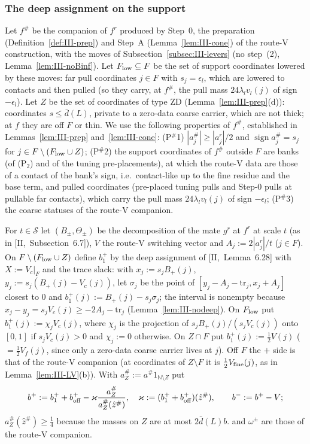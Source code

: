 \documentclass[10pt]{amsart}
\theoremstyle{definition}
\theoremstyle{remark}
\newcommand{\sgn}{\operatorname{sign}}
\newcommand{\N}{\mathbb N}
\newcommand{\zh}{\hat z}
\begin{document}
\subsubsection*{The deep assignment on the support}
Let $f^\#$ be the companion of $f^r$ produced by Step~0, the preparation
(Definition~\ref{def:III-prep}) and Step~A (Lemma~\ref{lem:III-cone}) of the
route-V construction, with the moves of Subsection~\ref{subsec:III-levers}
(no step~(2), Lemma~\ref{lem:III-noBinf}).  Let $F_{\rm low}\subseteq F$ be the
set of support coordinates lowered by these moves: far pull coordinates
$j\in F$ with $s_j=\epsilon_l$, which are lowered to contacts and then pulled
(so they carry, at $f^\#$, the pull mass $24\lambda_lv_l(j)$ of sign
$-\epsilon_l$).  Let $Z$ be the set of coordinates of type ZD
(Lemma~\ref{lem:III-prep}(d)): coordinates $s\le\bar d(L)$, private to a
zero-data coarse carrier, which are not thick; at $f$ they are off $F$ or thin.
We use the following properties of $f^\#$, established in
Lemmas~\ref{lem:III-prep} and~\ref{lem:III-cone}:
(P$^\#$1) $|a^\#_j|\ge|a^r_j|/2$ and $\sgn a^\#_j=s_j$ for $j\in F\setminus
(F_{\rm low}\cup Z)$; (P$^\#$2) the support coordinates of $f^\#$ outside $F$ are banks (of
(P$_2$) and of the tuning pre-placements), at which the route-V data are
those of a contact of the bank's sign, i.e.\ contact-like up to the fine
residue and the base term, and pulled coordinates (pre-placed tuning pulls
and Step-0 pulls at pullable far contacts), which carry the pull mass
$24\lambda_lv_l(j)$ of sign $-\epsilon_l$; (P$^\#$3) the coarse
statuses of the route-V companion.

For $t\in\mathcal S$ let $(B_\pm,\Theta_\pm)$ be the decomposition of the mate
$g^r$ at $f^r$ at scale $t$ (as in [II,~Subsection~6.7]), $V$ the route-V
switching vector and $A_j:=2|a^r_j|/t$ ($j\in F$).  On $F\setminus(F_{\rm low}
\cup Z)$
define $b^+_1$ by the deep assignment of [II,~Lemma~6.28] with $X:=V_c|_F$
and the trace slack: with $x_j:=s_jB_+(j)$, $y_j:=s_j(B_+(j)-V_c(j))$, let
$\sigma_j$ be the point of $[y_j-A_j-\mathrm{tr}_j,x_j+A_j]$ closest to $0$ and
$b^+_1(j):=B_+(j)-s_j\sigma_j$; the interval is nonempty because $x_j-y_j=
s_jV_c(j)\ge-2A_j-\mathrm{tr}_j$ (Lemma~\ref{lem:III-nodeep}).  On $F_{\rm low}$
put $b^+_1(j):=\chi_jV_c(j)$, where $\chi_j$ is the projection of
$s_jB_+(j)/(s_jV_c(j))$ onto $[0,1]$ if $s_jV_c(j)>0$ and $\chi_j:=0$ otherwise.
On $Z\cap F$ put $b^+_1(j):=\frac12V(j)$ ($=\frac12V_f(j)$, since only a
zero-data coarse carrier lives at $j$).  Off $F$ the $+$ side is that of the
route-V companion (at coordinates of $Z\setminus F$ it is $\frac12V_{\rm fine}(j)$,
as in Lemma~\ref{lem:III-LV}(b)).  With $a^\#_Z:=a^\#1_{\N\setminus Z}$ put
\[
 b^+:=b^+_1+b^+_{\rm off}-\varkappa\frac{a^\#_Z}{a^\#_Z(\zh^\#)},\quad
 \varkappa:=(b^+_1+b^+_{\rm off})(\zh^\#),\qquad b^-:=b^+-V;
\]
$a^\#_Z(\zh^\#)\ge\frac14$ because the masses on $Z$ are at most $2\bar d(L)b$.
and $\omega^\pm$ are those of the route-V companion.
\end{document}
